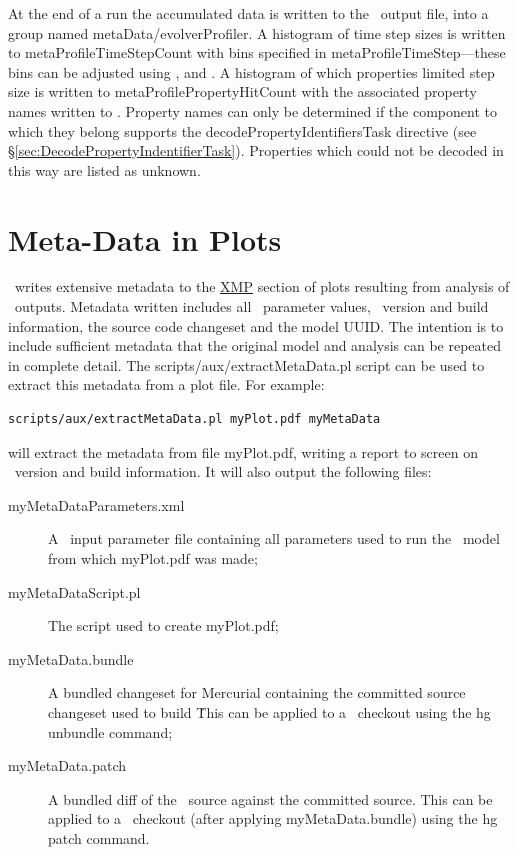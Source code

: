 At the end of a run the accumulated data is written to the \glc\ output file, into a group named {\normalfont \ttfamily metaData/evolverProfiler}. A histogram of time step sizes is written to {\normalfont \ttfamily metaProfileTimeStepCount} with bins specified in {\normalfont \ttfamily metaProfileTimeStep}---these bins can be adjusted using {\normalfont \ttfamily [metaProfileTimeStepMinimum]}, {\normalfont \ttfamily [metaProfileTimeStepMaximum]} and {\normalfont \ttfamily [metaProfileTimeStepPointsPerDecade]}. A histogram of which properties limited step size is written to {\normalfont \ttfamily metaProfilePropertyHitCount} with the associated property names written to {\normalfont \ttfamily [metaProfilePropertyNames]}. Property names can only be determined if the component to which they belong supports the {\normalfont \ttfamily decodePropertyIdentifiersTask} directive (see \S\ref{sec:DecodePropertyIndentifierTask}). Properties which could not be decoded in this way are listed as {\normalfont \ttfamily unknown}.

\section{Meta-Data in Plots}

\glc\ writes extensive metadata to the \href{http://en.wikipedia.org/wiki/Extensible_Metadata_Platform}{XMP} section of plots resulting from analysis of \glc\ outputs. Metadata written includes all \glc\ parameter values, \glc\ version and build information, the source code changeset and the model \gls{UUID}. The intention is to include sufficient metadata that the original model and analysis can be repeated in complete detail. The {\normalfont \ttfamily scripts/aux/extractMetaData.pl} script can be used to extract this metadata from a plot file. For example:
\begin{verbatim}
scripts/aux/extractMetaData.pl myPlot.pdf myMetaData
\end{verbatim}
will extract the metadata from file {\normalfont \ttfamily myPlot.pdf}, writing a report to screen on \glc\ version and build information. It will also output the following files:
\begin{description}
\item[{\normalfont \ttfamily myMetaDataParameters.xml}] A \glc\ input parameter file containing all parameters used to run the \glc\ model from which {\normalfont \ttfamily myPlot.pdf} was made;
\item[{\normalfont \ttfamily myMetaDataScript.pl}] The script used to create {\normalfont \ttfamily myPlot.pdf};
\item[{\normalfont \ttfamily myMetaData.bundle}] A bundled changeset for Mercurial containing the committed source changeset used to build \glc\. This can be applied to a \glc\ checkout using the {\normalfont \ttfamily hg unbundle} command;
\item[{\normalfont \ttfamily myMetaData.patch}] A bundled {\normalfont \ttfamily diff} of the \glc\ source against the committed source. This can be applied to a \glc\ checkout (after applying {\normalfont \ttfamily myMetaData.bundle}) using the {\normalfont \ttfamily hg patch} command.
\end{description}

